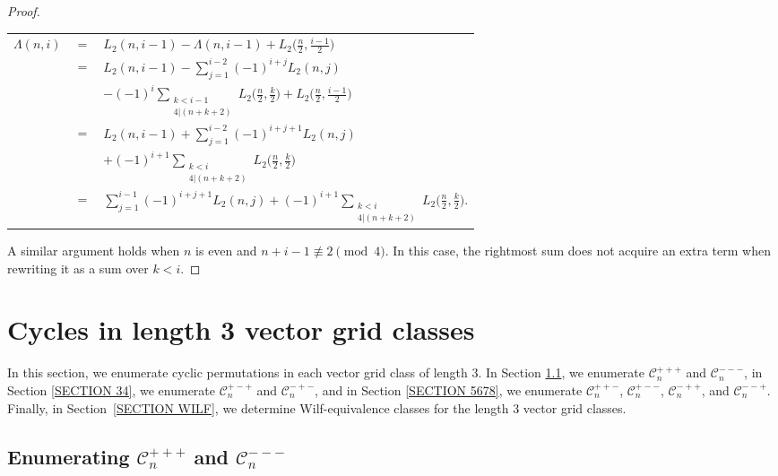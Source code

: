 \documentclass[12pt]{article}
\newcommand{\C}{\mathcal{C}}
\theoremstyle{plain}
\theoremstyle{definition}
\newcommand{\ds}{\displaystyle}
\begin{document}
\begin{proof}
\vspace{6pt}

	\begin{tabular}{rcl}
		$\Lambda(n,i)$ & $=$ & $\ds L_2(n,i-1)-\Lambda(n,i-1) + L_2\bigg(\frac{n}{2}, \frac{i-1}{2}\bigg)$\\
			& $=$ & $\ds L_2(n,i-1)-\sum_{j=1}^{i-2}(-1)^{i+j} L_2(n,j)$ \\
			 & & $\ds - (-1)^i\!\!\sum_{\substack{k<i-1\\4|(n+k+2)}}\! L_2 \bigg(\frac n2,\frac k2\bigg)+ L_2\bigg(\frac{n}{2}, \frac{i-1}{2}\bigg)$\\ 
			& $=$ & $\ds L_2(n,i-1)+\sum_{j=1}^{i-2}(-1)^{i+j+1} L_2(n,j) $\\ 
			& & $\ds + (-1)^{i+1}\!\!\sum_{\substack{k<i\\4|(n+k+2)}}\! L_2 \bigg(\frac n2,\frac k2\bigg)$ \\
			& $=$ & $\ds \sum_{j=1}^{i-1}(-1)^{i+j+1} L_2(n,j)+ (-1)^{i+1}\!\!\sum_{\substack{k<i\\4|(n+k+2)}}\! L_2 \bigg(\frac n2,\frac k2\bigg).$\\ 
	\end{tabular}
	\vspace{6pt}
	
A similar argument holds when $n$ is even and  $n+i-1 \not\equiv 2 \!\pmod 4$. In this case, the rightmost sum does not acquire an extra term when rewriting it as a sum over $k<i$. 
\end{proof}



\section{Cycles in length 3 vector grid classes}\label{section 3-vector}

In this section, we enumerate cyclic permutations in each vector grid class of length 3. In Section \ref{sec:1and2}, we enumerate $\C_n^{+++}$ and $\C_n^{---}$, in Section \ref{SECTION 34}, we enumerate $\C_n^{+-+}$ and $\C_n^{-+-}$, and in Section \ref{SECTION 5678}, we enumerate $\C_n^{++-}$, $\C_n^{+--}$, $\C_n^{-++}$, and $\C_n^{--+}$. Finally, in Section~\ref{SECTION WILF}, we determine Wilf-equivalence classes for the length 3 vector grid classes.

\subsection{Enumerating $\mathcal C_n^{+++}$ and $\mathcal C_n^{---}$}\label{sec:1and2}
\end{document}
